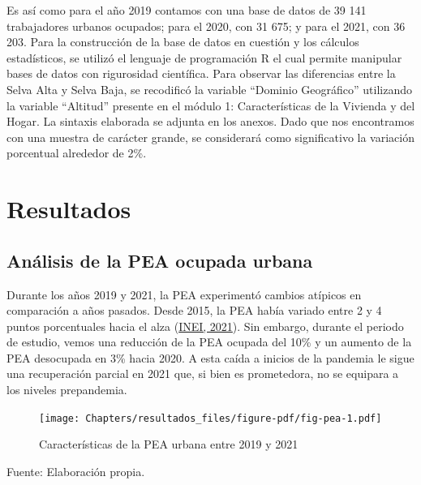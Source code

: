 \documentclass[
  letterpaper,
  12pt,
  oneside,
  spanish,
  doublespacing,
  headsepline,
  parskip]{MastersDoctoralThesis}
\begin{document}
Es así como para el año 2019 contamos con una base de datos de 39 141
trabajadores urbanos ocupados; para el 2020, con 31 675; y para el 2021,
con 36 203. Para la construcción de la base de datos en cuestión y los
cálculos estadísticos, se utilizó el lenguaje de programación R el cual
permite manipular bases de datos con rigurosidad científica. Para
observar las diferencias entre la Selva Alta y Selva Baja, se recodificó
la variable ``Dominio Geográfico'' utilizando la variable ``Altitud''
presente en el módulo 1: Características de la Vivienda y del Hogar. La
sintaxis elaborada se adjunta en los anexos. Dado que nos encontramos
con una muestra de carácter grande, se considerará como significativo la
variación porcentual alrededor de 2\%.


\hypertarget{sec-resultados}{%
\chapter{Resultados}\label{sec-resultados}}

\hypertarget{anuxe1lisis-de-la-pea-ocupada-urbana}{%
\section{Análisis de la PEA ocupada
urbana}\label{anuxe1lisis-de-la-pea-ocupada-urbana}}

Durante los años 2019 y 2021, la PEA experimentó cambios atípicos en
comparación a años pasados. Desde 2015, la PEA había variado entre 2 y 4
puntos porcentuales hacia el alza
(\protect\hyperlink{ref-inei2021}{INEI, 2021}). Sin embargo, durante el
periodo de estudio, vemos una reducción de la PEA ocupada del 10\% y un
aumento de la PEA desocupada en 3\% hacia 2020. A esta caída a inicios
de la pandemia le sigue una recuperación parcial en 2021 que, si bien es
prometedora, no se equipara a los niveles prepandemia.

\begin{figure}

\caption{\label{fig-pea}Características de la PEA urbana entre 2019 y
2021}

{\centering \texttt{[image: Chapters/resultados\_files/figure-pdf/fig-pea-1.pdf]}

}

\end{figure}

\noindent \small Fuente: Elaboración propia. \normalsize
\end{document}
